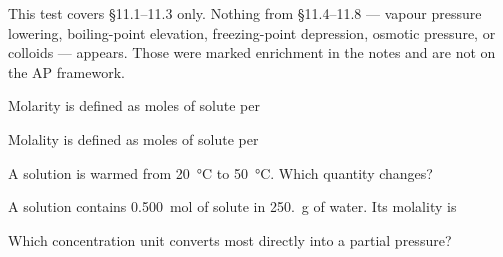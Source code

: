 \documentclass{apchem-exam}
\begin{document}
\apctitleblock

\begin{apcnote}[Scope]
This test covers \S11.1--11.3 only. Nothing from \S11.4--11.8 --- vapour
pressure lowering, boiling-point elevation, freezing-point depression,
osmotic pressure, or colloids --- appears. Those were marked enrichment in
the notes and are not on the AP framework.
\end{apcnote}


\begin{mcq}
  Molarity is defined as moles of solute per
  \choices
\end{mcq}

\begin{mcq}
  Molality is defined as moles of solute per
  \choices
\end{mcq}

\begin{mcq}
  A solution is warmed from \SI{20}{\celsius} to \SI{50}{\celsius}. Which
  quantity changes?
  \choices
\end{mcq}

\begin{mcq}
  A solution contains \SI{0.500}{\mole} of solute in \SI{250.}{\gram} of
  water. Its molality is
  \choices
\end{mcq}

\begin{mcq}
  Which concentration unit converts most directly into a partial pressure?
  \choices
\end{mcq}
\end{document}
